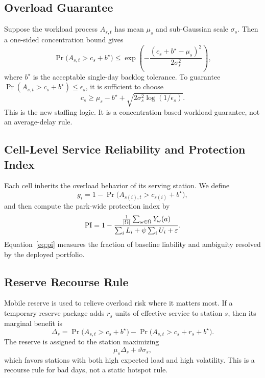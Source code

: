 \subsection{Overload Guarantee}
Suppose the workload process \(A_{s,t}\) has mean \(\mu_s\) and sub-Gaussian scale \(\sigma_s\). Then a one-sided concentration bound gives
\begin{equation}
\Pr\!\bigl(A_{s,t}>c_s+b^\star\bigr)
\le
\exp\!\left(
-\frac{(c_s+b^\star-\mu_s)^2}{2\sigma_s^2}
\right),
\label{eq:intercept}
\end{equation}
where \(b^\star\) is the acceptable single-day backlog tolerance. To guarantee
\(\Pr(A_{s,t}>c_s+b^\star)\le\epsilon_s\), it is sufficient to choose
\begin{equation}
c_s
\ge
\mu_s-b^\star+\sqrt{2\sigma_s^2\log(1/\epsilon_s)}.
\label{eq:rangermin}
\end{equation}
This is the new staffing logic. It is a concentration-based workload guarantee, not an average-delay rule.

\subsection{Cell-Level Service Reliability and Protection Index}
Each cell inherits the overload behavior of its serving station. We define
\begin{equation}
g_i = 1-\Pr\!\bigl(A_{s(i),t}>c_{s(i)}+b^\star\bigr),
\label{eq:service}
\end{equation}
and then compute the park-wide protection index by
\begin{equation}
\mathrm{PI}
=
1-
\frac{
\frac{1}{|\Omega|}\sum_{\omega\in\Omega}Y_\omega(a)
}{
\sum_i L_i+\psi\sum_i U_i+\varepsilon
}.
\label{eq:pi}
\end{equation}
Equation~\eqref{eq:pi} measures the fraction of baseline liability and ambiguity resolved by the deployed portfolio.

\subsection{Reserve Recourse Rule}
Mobile reserve is used to relieve overload risk where it matters most. If a temporary reserve package adds \(r_s\) units of effective service to station \(s\), then its marginal benefit is
\begin{equation}
\Delta_s
=
\Pr\!\bigl(A_{s,t}>c_s+b^\star\bigr)
-
\Pr\!\bigl(A_{s,t}>c_s+r_s+b^\star\bigr).
\label{eq:dispatchscore}
\end{equation}
The reserve is assigned to the station maximizing
\[
\mu_s\Delta_s+\vartheta \sigma_s,
\]
which favors stations with both high expected load and high volatility. This is a recourse rule for bad days, not a static hotspot rule.

